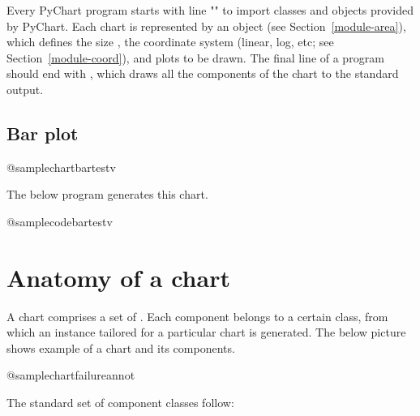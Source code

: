 \documentclass{howto}
\newcommand{\pychart}{PyChart}
\newcommand{\pxref}[1]{see Section~\ref{#1}}
\begin{document}
Every \pychart{} program starts with line ""
to import
classes and objects provided by \pychart{}.  Each chart is represented by
an  object (\pxref{module-area}),
which defines the size , the coordinate system
(linear, log, etc; \pxref{module-coord}), and plots to be drawn. The final line
of a program should end with , which draws all the
components of the chart to the standard output.

\subsection{Bar plot}

@samplechart{bartestv}

The below program generates this chart.

@samplecode{bartestv}

\section{Anatomy of a chart}\label{anatomy}

A chart comprises a set of . Each component belongs to a
certain class, from which an instance tailored for a particular chart is
generated. The below picture shows example of a chart and its components.

@samplechart{failureannot}


The standard set of component classes follow:
\end{document}
